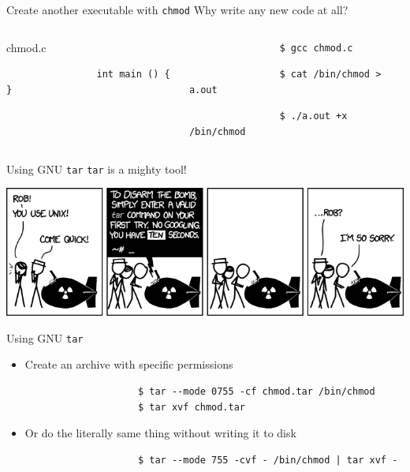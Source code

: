 \documentclass[aspectratio=169]{beamer}
\begin{document}
\begin{frame}[fragile]{Create another executable with \texttt{chmod}}
    Why write any new code at all?
    \pause
    \vfill
    \begin{columns}[onlytextwidth]
        \begin{column}{.5\textwidth}
            chmod.c
            \begin{verbatim}
                int main () { }
            \end{verbatim}
        \end{column}
        \begin{column}{.5\textwidth}
            \pause
            \begin{verbatim}
                $ gcc chmod.c
            \end{verbatim}
            \pause
            \begin{verbatim}
                $ cat /bin/chmod > a.out
            \end{verbatim}
            \pause
            \begin{verbatim}
                $ ./a.out +x /bin/chmod
            \end{verbatim}
        \end{column}
    \end{columns}
\end{frame}

\begin{frame}{Using GNU \texttt{tar}}
    \centering
    \texttt{tar} is a mighty tool!

    \includegraphics[width=.9\textwidth, keepaspectratio]{tar.png}
 \end{frame}

\begin{frame}[fragile]{Using GNU \texttt{tar}}
        \begin{itemize}
            \item Create an archive with specific permissions\\
                \pause \begin{verbatim}
                    $ tar --mode 0755 -cf chmod.tar /bin/chmod
                    $ tar xvf chmod.tar
                \end{verbatim}
            \pause
            \item Or do the literally same thing without writing it to disk\\
                \pause \begin{verbatim}
                    $ tar --mode 755 -cvf - /bin/chmod | tar xvf -
                \end{verbatim}
        \end{itemize}
\end{frame}
\end{document}
